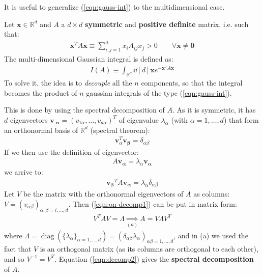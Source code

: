 \documentclass[../template.tex]{subfiles}
\begin{document}
It is useful to generalize (\ref{eqn:gauss-int}) to the multidimensional case.

Let $\bm{x} \in \mathbb{R}^d$ and $A$ a $d\times d$ \textbf{symmetric} and \textbf{positive definite} matrix, i.e. such that:
\begin{align}\label{eqn:pos-def}
    \bm{x}^T A \bm{x} \equiv \sum_{i,j=1}^d x_i A_{ij} x_j > 0 \qquad \forall \bm{x} \neq \bm{0}
\end{align}  
The multi-dimensional Gaussian integral is defined as:
\begin{align*}
    I(A) \equiv \int_{\mathbb{R}^d} \dd[d]{\bm{x}} e^{-\bm{x}^T A \bm{x}}
\end{align*}
To solve it, the idea is to \textit{decouple} all the $n$ components, so that the integral becomes the product of $n$ gaussian integrals of the type (\ref{eqn:gauss-int}).

\medskip

This is done by using the spectral decomposition of $A$. As it is symmetric, it has $d$ eigenvectors $\bm{v_{\cdot\alpha}} = (v_{1\alpha}, \dots, v_{d \alpha})^T$ of eigenvalue $\lambda_\alpha$ (with $\alpha =1, \dots, d$) that form an orthonormal basis of $\mathbb{R}^d$ (spectral theorem):
\begin{align*}
    \bm{v}_\alpha^T \bm{v_\beta} = \delta_{\alpha \beta}
\end{align*}
If we then use the definition of eigenvector:
\begin{align*}
    A \bm{v_\alpha} = \lambda_\alpha \bm{v_\alpha}
\end{align*}
we arrive to:
\begin{align}
    \bm{v_\beta}^T A \bm{v_\alpha} = \lambda_\alpha \delta_{\alpha \beta} \label{eqn:on-decomp1}
\end{align}
Let $V$ be the matrix with the orthonormal eigenvectors of $A$ as columns: $V=(v_{\alpha \beta})_{\alpha, \beta=i,\dots, d}$. Then (\ref{eqn:on-decomp1}) can be put in matrix form:
\begin{align}\label{eqn:decomp2}
    V^T A V = \Lambda \underset{(a)}{\Rightarrow}  A =V \Lambda V^T
\end{align}
where $\Lambda = \operatorname{diag}(\{\lambda_\alpha\}_{\alpha=1,\dots,d}) = (\delta_{\alpha \beta} \lambda_\alpha)_{\alpha \beta=1, \dots, d}$, and in (a)
we used the fact that $V$ is an orthogonal matrix (as its columns are orthogonal to each other), and so $V^{-1} = V^T$. Equation (\ref{eqn:decomp2}) gives the \textbf{spectral decomposition}  of $A$.
\end{document}
